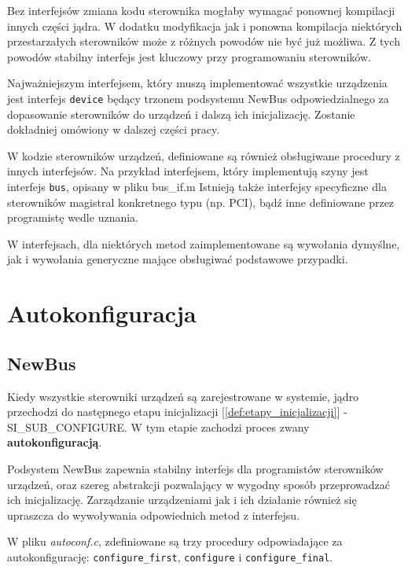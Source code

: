 \documentclass[shortabstract,inz]{iithesis}
\begin{document}
Bez interfejsów zmiana kodu sterownika mogłaby wymagać ponownej kompilacji innych części jądra. 
W dodatku modyfikacja jak i ponowna kompilacja niektórych przestarzałych sterowników może z różnych powodów
nie być już możliwa.
Z tych powodów stabilny interfejs jest kluczowy przy programowaniu sterowników.

Najważniejszym interfejsem, który muszą implementować wszystkie urządzenia
jest interfejs \texttt{device} będący trzonem podsystemu NewBus odpowiedzialnego za dopasowanie sterowników do
urządzeń i dalszą ich inicjalizację. Zostanie dokładniej omówiony w dalszej części pracy.

W kodzie sterowników urządzeń, definiowane są również obsługiwane procedury z innych interfejsów.
Na przykład interfejsem, który implementują szyny jest interfejs \texttt{bus}, opisany w pliku bus\_if.m
Istnieją także interfejsy specyficzne dla sterowników magistral konkretnego typu (np. PCI),
bądź inne definiowane przez programistę wedle uznania.

W interfejsach, dla niektórych metod zaimplementowane są wywołania dymyślne, jak i wywołania generyczne mające 
obsługiwać podstawowe przypadki.




\chapter{Autokonfiguracja}


\section{NewBus} %


Kiedy wszystkie sterowniki urządzeń są zarejestrowane w systemie, jądro przechodzi
do następnego etapu inicjalizacji [\ref{def:etapy_inicjalizacji}] - SI\_SUB\_CONFIGURE.
W tym etapie zachodzi proces zwany \textbf{autokonfiguracją}\label{def:autoconf}.

Podsystem NewBus zapewnia stabilny interfejs dla programistów sterowników urządzeń, oraz
szereg abstrakcji pozwalający w wygodny sposób przeprowadzać ich inicjalizację.
Zarządzanie urządzeniami jak i ich działanie również się upraszcza do wywoływania
odpowiednich metod z interfejsu.

W pliku \textit{autoconf.c}, zdefiniowane są trzy procedury odpowiadające za autokonfigurację:
\texttt{configure\_first}, \texttt{configure} i \texttt{configure\_final}.
\end{document}
